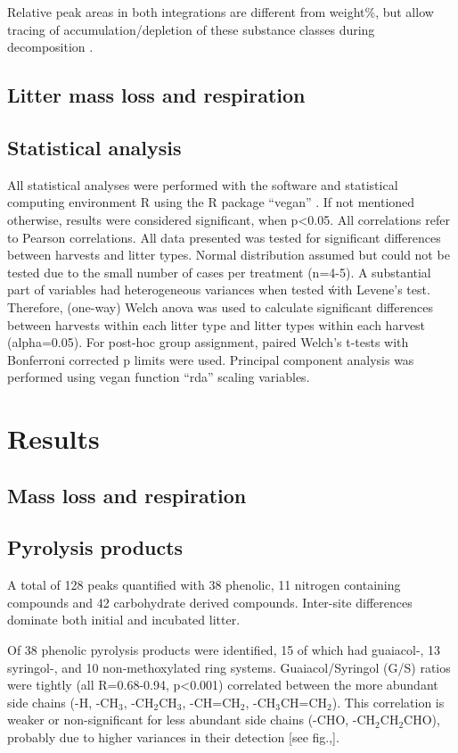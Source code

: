\documentclass[preprint,review,12pt]{elsarticle}
\begin{document}
Relative peak areas in both integrations are different from weight\%, but allow tracing of accumulation/depletion of these substance classes during decomposition \citep{Schellekens2009}. 

\subsection{Litter mass loss and respiration}

\subsection{Statistical analysis}
All statistical analyses were performed with the software and statistical computing environment R using the R package ``vegan'' \citep{Oksanen2011}. If not mentioned otherwise, results were considered significant, when p\textless 0.05. All correlations refer to Pearson correlations.
All data presented was tested for significant differences between harvests and litter types. Normal distribution assumed but could not be tested due to the small number of cases per treatment (n=4-5). A substantial part of variables had heterogeneous variances when tested ẃith Levene's test. Therefore, (one-way) Welch anova was used to calculate significant differences between harvests within each litter type and litter types within each harvest (alpha=0.05). For post-hoc group assignment, paired Welch's t-tests with Bonferroni corrected p limits were used. Principal component analysis was performed using vegan function ``rda'' scaling variables.

\section{Results}

\subsection{Mass loss and respiration}

\subsection{Pyrolysis products}

A total of 128 peaks quantified with 38 phenolic, 11 nitrogen containing compounds and 42 carbohydrate derived compounds. Inter-site differences dominate both initial and incubated litter.

Of 38 phenolic pyrolysis products were identified, 15 of which had guaiacol-, 13 syringol-, and 10 non-methoxylated ring systems. Guaiacol/Syringol (G/S) ratios were tightly (all R=0.68-0.94, p<0.001) correlated between the more abundant side chains (-H, -CH$_3$, -CH$_2$CH$_3$, -CH=CH$_2$, -CH$_3$CH=CH$_2$). This correlation is weaker or non-significant for less abundant side chains (-CHO, -CH$_2$CH$_2$CHO), probably due to higher variances in their detection [see fig.,]. 
\end{document}
